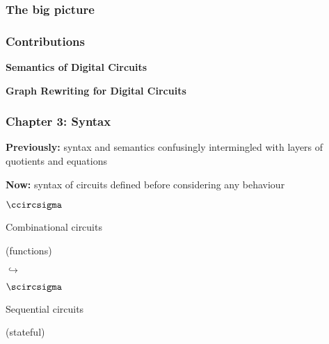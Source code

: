\begin{frame}
    \frametitle{The big picture}



\end{frame}

\begin{frame}
    \frametitle{Contributions}



    \begin{center}
        \begin{minipage}{0.45\textwidth}
            \centering
            \textbf{Semantics of Digital Circuits}
        \end{minipage}
        \begin{minipage}{0.45\textwidth}
            \centering
            \textbf{Graph Rewriting for Digital Circuits}
        \end{minipage}
    \end{center}

\end{frame}

\begin{frame}
    \frametitle{Chapter 3: Syntax}

    \textbf{Previously:} syntax and semantics confusingly intermingled with
    layers of quotients and equations

    \pause

    \textbf{Now:} syntax of circuits defined before considering any behaviour

    \pause

    \vspace{1em}

    \begin{center}
        \begin{minipage}{0.4\textwidth}
            \centering
            {\LARGE\(\ccircsigma\)}

            \vspace{1em}

            \alert{Combinational} circuits

            (functions)
        \end{minipage}
        \pause
        {\LARGE\(\hookrightarrow\)}
        \begin{minipage}{0.4\textwidth}
            \centering
            {\LARGE\(\scircsigma\)}

            \vspace{1em}

            \alert{Sequential} circuits

            (stateful)
        \end{minipage}
    \end{center}

\end{frame}

